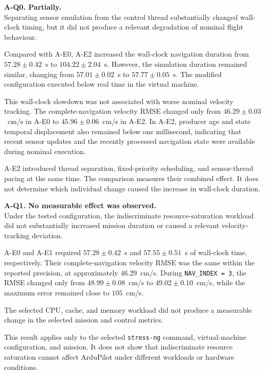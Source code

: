 \noindent \textbf{A-Q0. Partially.} \\
\noindent Separating sensor emulation from the control thread substantially changed wall-clock timing, but it did not produce a relevant degradation of nominal flight behaviour.

\noindent Compared with A-E0, A-E2 increased the wall-clock navigation duration from \(57.28 \pm 0.42\)~s to \(104.22 \pm 2.04\)~s. However, the simulation duration remained similar, changing from \(57.01 \pm 0.02\)~s to \(57.77 \pm 0.05\)~s. The modified configuration executed below real time in the virtual machine.

\noindent This wall-clock slowdown was not associated with worse nominal velocity tracking. The complete-navigation velocity RMSE changed only from \(46.29 \pm 0.03\)~cm/s in A-E0 to
\(45.96 \pm 0.06\)~cm/s in A-E2. In A-E2, producer age and state temporal displacement also remained below one millisecond, indicating that recent sensor updates and the recently processed navigation state were available during nominal execution.

\noindent A-E2 introduced thread separation, fixed-priority scheduling, and sensor-thread pacing at the same time. The comparison measures their combined effect. It does not determine which individual change caused the increase in wall-clock duration.

\noindent \textbf{A-Q1. No measurable effect was observed.} \\
\noindent Under the tested configuration, the indiscriminate resource-saturation
workload did not substantially increased mission duration or caused
a relevant velocity-tracking deviation.

\noindent A-E0 and A-E1 required \(57.28 \pm 0.42\)~s and
\(57.55 \pm 0.51\)~s of wall-clock time, respectively. Their
complete-navigation velocity RMSE was the same within the reported
precision, at approximately \(46.29\)~cm/s. During
\texttt{NAV\_INDEX = 3}, the RMSE changed only from
\(48.99 \pm 0.08\)~cm/s to \(49.02 \pm 0.10\)~cm/s, while the
maximum error remained close to \(105\)~cm/s.

\noindent The selected CPU, cache, and memory workload did not
produce a measurable change in the selected mission and control
metrics.

\noindent This result applies only to the selected \texttt{stress-ng} command,
virtual-machine configuration, and mission. It does not show that
indiscriminate resource saturation cannot affect ArduPilot under
different workloads or hardware conditions.

